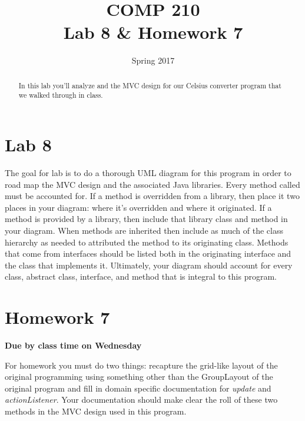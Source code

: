 \documentclass[]{tufte-handout}
\title{COMP 210 \\ Lab 8 \& Homework 7}
\date{Spring 2017}
\begin{document}
\maketitle

\begin{abstract}
In this lab you'll analyze and the MVC design for our Celsius converter program that we walked through in class.
\end{abstract}

\section{Lab 8}

The goal for lab is to do a thorough UML diagram for this program in order to road map the MVC design and the associated Java libraries. Every method called must be accounted for. If a method is overridden from a library, then place it two places in your diagram: where it's overridden and where it originated. If a method is provided by a library, then include that library class and method in your diagram. When methods are inherited then include as much of the class hierarchy as needed to attributed the method to its originating class. Methods that come from interfaces should be listed both in the originating interface and the class that implements it. Ultimately, your diagram should account for every class, abstract class, interface, and method that is integral to this program.

\section{Homework 7}

\begin{center}
\textbf{Due by class time on Wednesday}
\end{center}

For homework you must do two things: recapture the grid-like layout of the original programming using something other than the GroupLayout of the original program and fill in domain specific documentation for \textit{update} and \textit{actionListener}.  Your documentation should make clear the roll of these two methods in the MVC design used in this program.  
\end{document}
